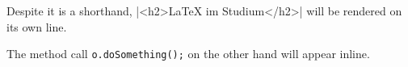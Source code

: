 \documentclass[a4paper]{article}
\begin{document}
\thispagestyle{empty}

Despite it is a shorthand, |<h2>LaTeX im Studium</h2>| will be rendered on its own line.

The method call \texttt{o.doSomething();} on the other hand will appear inline.
\end{document}
